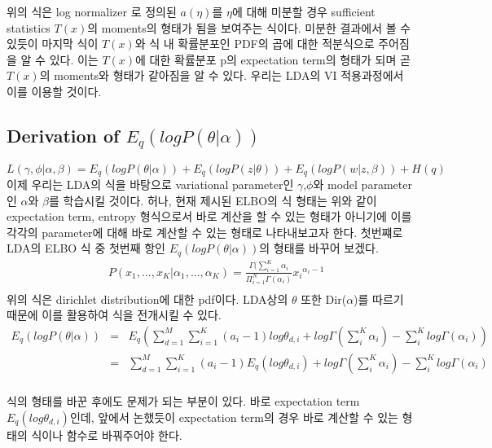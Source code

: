 \documentclass[draft=false]{oblivoir}
\begin{document}
위의 식은 log normalizer 로 정의된 $a(\eta)$를 $\eta$에 대해 미분할 경우 sufficient statistics $T(x)$의 moments의 형태가 됨을 보여주는 식이다. 미분한 결과에서 볼 수 있듯이 마지막 식이 $T(x)$와 식 내 확률분포인 PDF의 곱에 대한 적분식으로 주어짐을 알 수 있다. 이는 $T(x)$에 대한 확률분포 p의 expectation term의 형태가 되며 곧 $T(x)$의 moments와 형태가 같아짐을 알 수 있다. 우리는 LDA의 VI 적용과정에서 이를 이용할 것이다. 

\subsection{Derivation of \texorpdfstring{$E_{q}(log P(\theta|\alpha))$}{Lg}}
\begin{equation}
L(\gamma,\phi|\alpha,\beta)\nonumber = E_{q}(log P(\theta|\alpha))+E_{    q}(log P(z|\theta))+E_{q}(log P(w|z,\beta))+H(q)\nonumber
\end{equation}
이제 우리는 LDA의 식을 바탕으로 variational parameter인 $\gamma$,$\phi$와 model parameter인 $\alpha$와 $\beta$를 학습시킬 것이다. 허나, 현재 제시된 ELBO의 식 형태는 위와 같이 expectation term, entropy 형식으로서 바로 계산을 할 수 있는 형태가 아니기에 이를 각각의 parameter에 대해 바로 계산할 수 있는 형태로 나타내보고자 한다. 첫번쨰로 LDA의 ELBO 식 중 첫번째 항인 $E_{q}(log P(\theta|\alpha))$의 형태를 바꾸어 보겠다. 
\begin{eqnarray*}
&P(x_{1},...,x_{K}|\alpha_{1},...,\alpha_{K}) = \frac{\Gamma(\sum^{K}_{i=1}\alpha_{i}}{\Pi^{N}_{i=1}\Gamma(\alpha_{i})}{x_{i}}^{\alpha_{i}-1}\nonumber\\
\label{eq:Q()11-2-5-9}
\end{eqnarray*}
위의 식은 dirichlet distribution에 대한 pdf이다. LDA상의 $\theta$ 또한 Dir($\alpha$)를 따르기 때문에 이를 활용하여 식을 전개시킬 수 있다. 
\begin{eqnarray}
E_{q}(log P(\theta|\alpha))& = & E_{q}\left(\sum^{M}_{d=1}\sum^{K}_{i=1}(a_{i}-1)log\theta_{d,i}+ log\Gamma\left(\sum^{K}_{i}\alpha_{i}\right)-\sum^{K}_{i}log\Gamma(\alpha_{i})\right)\nonumber\\
& = & \sum^{M}_{d=1}\sum^{K}_{i=1}(a_{i}-1)E_{q}(log\theta_{d,i})+log\Gamma\left(\sum^{K}_{i}\alpha_{i}\right)-\sum^{K}_{i}log\Gamma(\alpha_{i})\nonumber\\
\end{eqnarray}

식의 형태를 바꾼 후에도 문제가 되는 부분이 있다. 바로 expectation term $E_{q}(log\theta_{d,i})$인데, 앞에서 논했듯이 expectation term의 경우 바로 계산할 수 있는 형태의 식이나 함수로 바꿔주어야 한다. 
\end{document}
